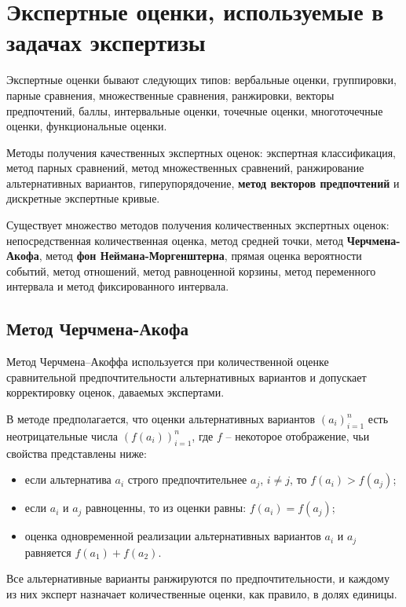 \documentclass[a4paper,12pt]{extreport}
\begin{document}


\section*{Экспертные оценки, используемые в задачах экспертизы} %
\label{sec:expert_grades}

Экспертные оценки бывают следующих типов: вербальные оценки, группировки,
парные сравнения, множественные сравнения, ранжировки, векторы предпочтений,
баллы, интервальные оценки, точечные оценки, многоточечные оценки, функциональные
оценки.

Методы получения качественных экспертных оценок: экспертная классификация,
метод парных сравнений, метод множественных сравнений, ранжирование альтернативных
вариантов, гиперупорядочение, \textbf{метод векторов предпочтений} и дискретные
экспертные кривые.

Существует множество методов получения количественных экспертных оценок:
непосредственная количественная оценка, метод средней точки, метод \textbf{Черчмена-Акофа},
метод \textbf{фон Неймана-Моргенштерна}, прямая оценка вероятности событий, метод отношений,
метод равноценной корзины, метод переменного интервала и метод фиксированного интервала.

\subsection*{Метод Черчмена-Акофа} %
\label{sub:Churchman_Akoff_method}

Метод Черчмена--Акоффа используется при количественной оценке сравнительной
предпочтительности альтернативных вариантов и допускает корректировку оценок,
даваемых экспертами.

В методе предполагается, что оценки альтернативных вариантов $(a_i)_{i=1}^n$ есть
неотрицательные числа $(f(a_i))_{i=1}^n$, где $f$ -- некоторое отображение, чьи
свойства представлены ниже: \begin{itemize}
	\item если альтернатива $a_i$ строго предпочтительнее $a_j$, $i\neq j$, то $f(a_i)>f(a_j)$;
	\item если $a_i$ и  $a_j$ равноценны, то из оценки равны: $f(a_i)=f(a_j)$;
	\item оценка одновременной реализации альтернативных вариантов $a_i$ и $a_j$
	равняется $f(a_1)+f(a_2)$.
\end{itemize}
Все альтернативные варианты ранжируются по предпочтительности, и каждому из них
эксперт назначает количественные оценки, как правило, в долях единицы.
\end{document}

